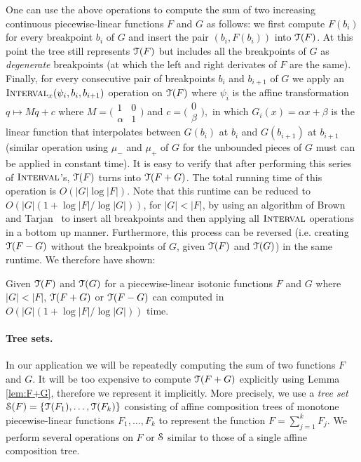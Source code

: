\documentclass[11pt]{article}
\def\tvec{c}
\def\amat{M}
\def\qq{q}
\def\TT{\EuScript{T}}
\def\itrans{\mathop{\textsc{Interval}}}
\renewcommand{\c}[1]{\ensuremath{\EuScript{#1}}}
\begin{document}
One can use the above operations to compute the sum of two increasing continuous piecewise-linear functions $F$ and $G$ as follows: we first compute $F(b_i)$ for every breakpoint $b_i$ of $G$ and insert the pair $(b_i, F(b_i))$ into $\TT(F)$.  At this point  the tree still represents $\TT(F)$ but includes all the breakpoints of $G$ as {\em degenerate} breakpoints (at which the left and right derivates of $F$ are the same). Finally, for every consecutive pair of breakpoints $b_i$ and $b_{i+1}$ of $G$ we  apply an $\itrans_x(\psi_i, b_i, b_{i+1})$ operation on $\TT(F)$ where $\psi_i$ is the affine transformation $\qq \mapsto \amat\qq + \tvec$ where
$
\amat = \bigl(\begin{smallmatrix}1 & 0 \\ \alpha & 1 \end{smallmatrix}\bigr)
$ 
and 
$
\tvec = \bigl(\begin{smallmatrix}0 \\ \beta \end{smallmatrix}\bigr),
$ 
in which $G_i(x) = \alpha x + \beta$ is the linear function that interpolates between $G(b_i)$ at $b_i$ and $G(b_{i+1})$ at $b_{i+1}$ (similar operation using $\mu_-$ and $\mu_+$ of $G$ for the unbounded pieces of $G$ must can be applied in constant time). It is easy to verify that after performing this series of $\itrans$'s, $\TT(F)$ turns into $\TT(F+G)$. The total running time of this operation is $O(|G| \log |F|)$. Note that this runtime can be reduced to $O(|G| (1+ \log|F|/\log |G|))$,  for $|G| < |F|$, by using an algorithm of Brown and Tarjan~\cite{BT79} to insert all breakpoints and then applying all $\itrans$ operations in a bottom up manner.  Furthermore, this process can be reversed (i.e. creating $\TT(F-G)$ without the breakpoints of $G$, given $\TT(F)$ and $\TT(G)$) in the same runtime.  We therefore have shown:

\begin{lemma}
Given $\TT(F)$ and $\TT(G)$ for a piecewise-linear isotonic functions $F$ and $G$ where $|G| < |F|$, $\TT(F+G)$ or $\TT(F-G)$ can computed in $O(|G|(1+\log |F| /\log |G|))$ time.
\label{lem:F+G}
\end{lemma}


\paragraph{Tree sets.}
In our application we will be repeatedly computing the sum of two functions $F$ and $G$.  It will be too expensive to compute $\TT(F + G)$ explicitly using Lemma \ref{lem:F+G}, therefore we represent it implicitly.  More precisely, we use a \emph{tree set} $\c{S}(F) = \{\TT(F_1), \ldots, \TT(F_k)\}$ consisting of affine composition trees of  monotone piecewise-linear functions $F_1, \ldots, F_k$ to represent the function $F = \sum_{j=1}^k F_j$. We perform several operations on $F$ or $\c{S}$ similar to those of a single affine composition tree.  
\end{document}
